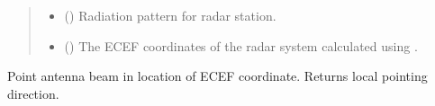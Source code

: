 \documentclass[letterpaper,10pt,english]{sphinxmanual}
\begin{document}
\begin{fulllineitems}
\begin{quote}
\begin{description}
\begin{itemize}
\item {} 
 ({\hyperref[\detokenize{modules/antenna:antenna.BeamPattern}]{}}) \textendash{} Radiation pattern for radar station.

\item {} 
 () \textendash{} The ECEF coordinates of the radar system calculated using {\hyperref[\detokenize{modules/coord:coord.geodetic2ecef}]{}}.

\end{itemize}

\end{description}\end{quote}

\begin{fulllineitems}
\label{\detokenize{modules/antenna:antenna.AntennaRX.point_ecef}}
Point antenna beam in location of ECEF coordinate. Returns local pointing direction.

\end{fulllineitems}


\end{fulllineitems}

\end{document}
